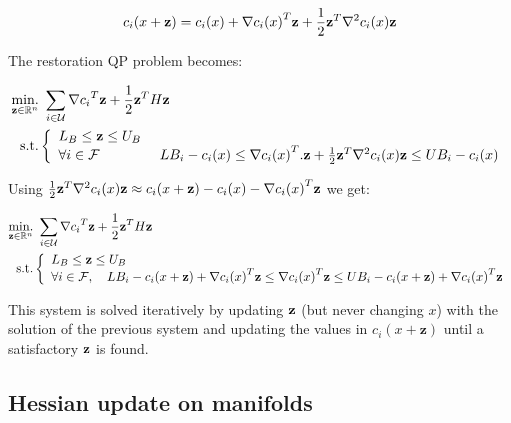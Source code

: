 \begin{equation}
  c_i(x+{\bf z}) = c_i(x) + {\nabla c_i(x)}^T {\bf z} + \frac{1}{2}{\bf z}^T{\nabla}^2c_i(x){\bf z}
\end{equation}

The restoration QP problem becomes:

\begin{align}
  \operatorname*{min.}_{{\bf z} \in \mathbb{R}^n} &\ \sum_{i\in \mathcal{U}} {\nabla c_i}^T{\bf z} + \frac{1}{2}{{\bf z}^T H{\bf z}} \nonumber
  \\ \text{s.t.}&
  \left\{
  \begin{array}{lr}
    { L_B \leq {\bf z} \leq U_B}\\
    \forall i \in \mathcal{F} &\ {LB_i - c_i(x)\leq {\nabla c_i(x)}^T.{\bf z} + \frac{1}{2}{\bf z}^T{\nabla}^2c_i(x){\bf z} \leq UB_i - c_i(x)}\\
  \end{array}
  \right.
\end{align}

Using $ \frac{1}{2}{\bf z}^T{\nabla}^2c_i(x){\bf z} \approx c_i(x+{\bf z}) - c_i(x) - {\nabla c_i(x)}^T {\bf z} $
we get:

\begin{align}
  \operatorname*{min.}_{{\bf z} \in \mathbb{R}^n} &\ \sum_{i\in \mathcal{U}} {\nabla c_i}^T{\bf z} + \frac{1}{2}{{\bf z}^T H{\bf z}} \nonumber\\
  \text{s.t.}&
  \left\{
  \begin{array}{lr}
    L_B \leq {\bf z} \leq U_B \\
    \forall i \in \mathcal{F},\quad {LB_i - c_i(x +{\bf z}) + {\nabla c_i(x)}^T{\bf z} \leq {\nabla c_i(x)}^T{\bf z} \leq UB_i - c_i(x +{\bf z}) + {\nabla c_i(x)}^T{\bf z}}\\
  \end{array}
  \right.
\end{align}

This system is solved iteratively by updating $\bf z$ (but never changing $x$) with the solution of the previous system and updating the values in $c_i(x+\mathbf{z})$ until a satisfactory $\bf z$ is found.

\subsection{Hessian update on manifolds}
\label{sub:hessian_update_on_manifolds}

